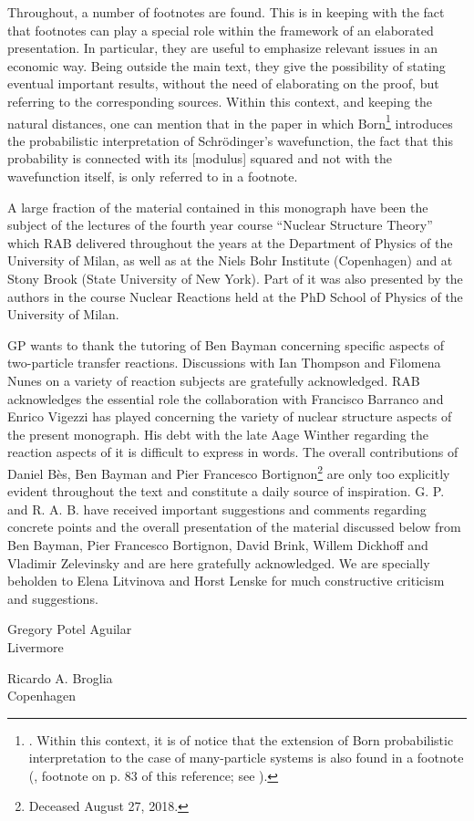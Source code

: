 Throughout, a number of footnotes are found. This is in keeping with the fact that footnotes can play a special role within the framework of an elaborated presentation. In particular, they are useful to emphasize relevant issues in an economic way. Being outside the main text, they give the possibility of stating eventual important results, without the need of elaborating on the proof, but referring to the corresponding sources.
 Within this context, and keeping the natural distances, one can mention that in the paper  in which Born\footnote{\cite{Born:26}. Within this context, it is of notice that the extension of Born probabilistic interpretation to the case of many-particle systems is also found in a footnote (\cite{Pauli:27}, footnote on p. 83 of this reference; see  \cite{Pais:86}).} introduces the probabilistic interpretation of Schr\"odinger's  wavefunction, the fact that this probability is connected with its [modulus] squared and not with the wavefunction itself, is only referred to in a footnote.



  A large fraction of the material contained in this monograph have been the subject of the lectures of the fourth year course ``Nuclear Structure Theory'' which RAB delivered throughout the years at the Department of Physics of the University of Milan, as well as at the Niels Bohr Institute (Copenhagen) and at Stony Brook (State University of New York). Part of it was also presented by the authors in the course Nuclear Reactions held at the PhD School of Physics of the University of Milan.

GP wants to thank the tutoring of  Ben Bayman concerning specific aspects of two-particle transfer reactions. Discussions with Ian Thompson and Filomena Nunes on a variety of reaction subjects are gratefully acknowledged. 
RAB  acknowledges the essential role the collaboration with Francisco Barranco and Enrico Vigezzi has played concerning the variety of nuclear structure aspects of the present monograph. His debt with the late Aage Winther regarding the reaction aspects of it is difficult to express in words. The overall contributions of Daniel B\`{e}s, Ben Bayman and Pier Francesco Bortignon\footnote{Deceased August 27, 2018.} are only too explicitly evident throughout the text and constitute a daily source of inspiration.  G. P. and R. A. B. have received important suggestions and comments regarding concrete points and the overall presentation of the material discussed below from Ben Bayman, Pier Francesco Bortignon, David Brink, Willem Dickhoff and Vladimir Zelevinsky and are here gratefully acknowledged. We are specially beholden to Elena Litvinova and Horst Lenske for much constructive criticism and suggestions.
\begin{flushleft}
Gregory Potel Aguilar\\
Livermore
\end{flushleft}
\vspace{-1.7cm}
\begin{flushright}
Ricardo A. Broglia\\
 Copenhagen
\end{flushright}

%
%

